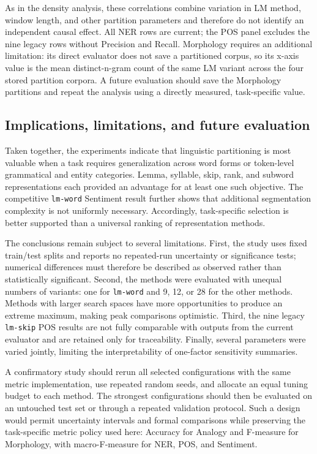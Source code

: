 As in the density analysis, these correlations combine variation in LM
method, window length, and other partition parameters and therefore do not
identify an independent causal effect. All NER rows are current; the POS panel
excludes the nine legacy rows without Precision and Recall. Morphology
requires an additional limitation: its direct evaluator does not save a
partitioned corpus, so its x-axis value is the mean distinct-n-gram count of
the same LM variant across the four stored partition corpora. A future
evaluation should save the Morphology partitions and repeat the analysis
using a directly measured, task-specific value.

\subsection{Implications, limitations, and future evaluation}

Taken together, the experiments indicate that linguistic partitioning is most
valuable when a task requires generalization across word forms or
token-level grammatical and entity categories. Lemma, syllable, skip, rank,
and subword representations each provided an advantage for at least one such
objective. The competitive \texttt{lm-word} Sentiment result further shows
that additional segmentation complexity is not uniformly necessary.
Accordingly, task-specific selection is better supported than a universal
ranking of representation methods.

The conclusions remain subject to several limitations. First, the study uses
fixed train/test splits and reports no repeated-run uncertainty or
significance tests; numerical differences must therefore be described as
observed rather than statistically significant. Second, the methods were
evaluated with unequal numbers of variants: one for \texttt{lm-word} and
9, 12, or 28 for the other methods. Methods with larger search spaces have
more opportunities to produce an extreme maximum, making peak comparisons
optimistic. Third, the nine legacy \texttt{lm-skip} POS results are not fully
comparable with outputs from the current evaluator and are retained only for
traceability. Finally, several parameters were varied jointly, limiting the
interpretability of one-factor sensitivity summaries.

A confirmatory study should rerun all selected configurations with the same
metric implementation, use repeated random seeds, and allocate an equal tuning
budget to each method. The strongest configurations should then be evaluated
on an untouched test set or through a repeated validation protocol. Such a
design would permit uncertainty intervals and formal comparisons while
preserving the task-specific metric policy used here: Accuracy for Analogy and
F-measure for Morphology, with macro-F-measure for NER, POS, and Sentiment.
